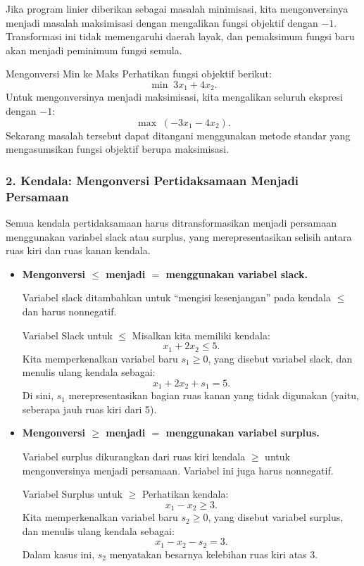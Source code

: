 Jika program linier diberikan sebagai masalah minimisasi, kita mengonversinya menjadi masalah maksimisasi dengan mengalikan fungsi objektif dengan \( -1 \). Transformasi ini tidak memengaruhi daerah layak, dan pemaksimum fungsi baru akan menjadi peminimum fungsi semula.

\begin{example}{Mengonversi Min ke Maks}
Perhatikan fungsi objektif berikut:
\[
\min \; 3x_1 + 4x_2.
\]
Untuk mengonversinya menjadi maksimisasi, kita mengalikan seluruh ekspresi dengan \( -1 \):
\[
\max \; (-3x_1 - 4x_2).
\]
Sekarang masalah tersebut dapat ditangani menggunakan metode standar yang mengasumsikan fungsi objektif berupa maksimisasi.
\end{example}
\newpage
\subsubsection*{2. Kendala: Mengonversi Pertidaksamaan Menjadi Persamaan}

Semua kendala pertidaksamaan harus ditransformasikan menjadi persamaan menggunakan variabel slack atau surplus, yang merepresentasikan selisih antara ruas kiri dan ruas kanan kendala.

\begin{itemize}
    \item[(a)] \textbf{Mengonversi \( \leq \) menjadi \( = \) menggunakan variabel slack.}

    Variabel slack ditambahkan untuk ``mengisi kesenjangan'' pada kendala \( \leq \) dan harus nonnegatif.

    \begin{example}{Variabel Slack untuk \(\leq\)}
    Misalkan kita memiliki kendala:
    \[
    x_1 + 2x_2 \leq 5.
    \]
    Kita memperkenalkan variabel baru \( s_1 \geq 0 \), yang disebut variabel slack, dan menulis ulang kendala sebagai:
    \[
    x_1 + 2x_2 + s_1 = 5.
    \]
    Di sini, \( s_1 \) merepresentasikan bagian ruas kanan yang tidak digunakan (yaitu, seberapa jauh ruas kiri dari 5).
    \end{example}

    \item[(b)] \textbf{Mengonversi \( \geq \) menjadi \( = \) menggunakan variabel surplus.}

    Variabel surplus dikurangkan dari ruas kiri kendala \( \geq \) untuk mengonversinya menjadi persamaan. Variabel ini juga harus nonnegatif.

    \begin{example}{Variabel Surplus untuk \(\geq\)}
    Perhatikan kendala:
    \[
    x_1 - x_2 \geq 3.
    \]
    Kita memperkenalkan variabel baru \( s_2 \geq 0 \), yang disebut variabel surplus, dan menulis ulang kendala sebagai:
    \[
    x_1 - x_2 - s_2 = 3.
    \]
    Dalam kasus ini, \( s_2 \) menyatakan besarnya kelebihan ruas kiri atas 3.
    \end{example}
\end{itemize}

